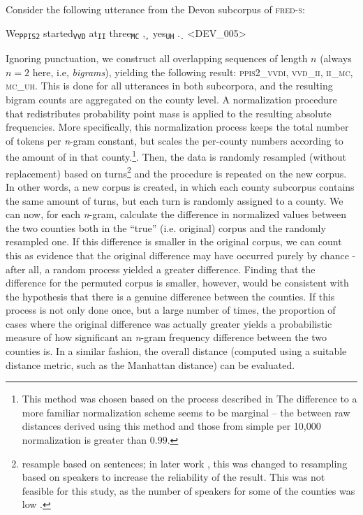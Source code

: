 \documentclass[output=paper]{LSP/langsci}
\begin{document}
Consider the following utterance from the Devon subcorpus of \textsc{fred-s}:

\begin{exe}
\ex We\textsubscript{\texttt{PPIS2}} started\textsubscript{\texttt{VVD}} at\textsubscript{\texttt{II}} three\textsubscript{\texttt{MC}} ,\textsubscript{\texttt{,}} yes\textsubscript{\texttt{UH}} .\textsubscript{\texttt{.}}  <DEV\_005>
\end{exe}

Ignoring punctuation, we construct all overlapping sequences of length $n$ (always $n=2$ here, i.e, \emph{bigrams}), yielding the following result: \textsc{ppis2\_vvdi}, \textsc{vvd\_ii}, \textsc{ii\_mc}, \textsc{mc\_uh}. 
This is done for all utterances in both subcorpora, and the resulting bigram counts are aggregated on the county level.
A normalization procedure that redistributes probability point mass is applied to the resulting absolute frequencies.
More specifically, this normalization process keeps the total number of tokens per \emph{n}-gram constant, but scales the per-county numbers according to the amount of  in that county.\footnote{This method was chosen based on the process described in \citet{nerbonne_measure_2006}
The difference to a more familiar normalization scheme seems to be marginal -- the  between raw distances derived using this method and those from simple per 10,000  normalization is greater than $0.99$.}.
Then, the data is randomly resampled (without replacement) based on turns\footnote{\citet{nerbonne_measure_2006} resample based on sentences; in later work \citep{wiersma_automatically_2011}, this was changed to resampling based on speakers to increase the reliability of the result.
This was not feasible for this study, as the number of speakers for some of the counties was low \citep[see also][]{sanders_statistical_2010}.}
and the procedure is repeated on the new corpus.
In other words, a new corpus is created, in which each county subcorpus contains the same amount of turns, but each turn is randomly assigned to a county.
We can now, for each \emph{n}-gram, calculate the difference in normalized values between the two counties both in the ``true'' (i.e. original) corpus and the randomly resampled one.
If this difference is smaller in the original corpus, we can count this as evidence that the original difference may have occurred purely by chance - after all, a random process yielded a greater difference.
Finding that the difference for the permuted corpus is smaller, however, would be consistent with the hypothesis that there is a genuine difference between the counties.
If this process is not only done once, but a large number of times, the proportion of cases where the original difference was actually greater yields a probabilistic measure of how significant an \emph{n}-gram frequency difference between the two counties is.
In a similar fashion, the overall distance (computed using a suitable distance metric, such as the Manhattan distance) can be evaluated.
\end{document}
